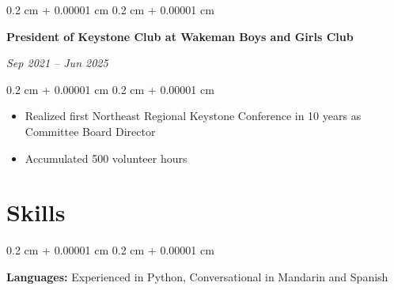 \documentclass[10pt, letterpaper]{article}
\newenvironment{highlights}{
    \begin{itemize}[
        topsep=0.10 cm,
        parsep=0.10 cm,
        partopsep=0pt,
        itemsep=0pt,
        leftmargin=0.4 cm + 10pt
    ]
}{
    \end{itemize}
} %
\newenvironment{onecolentry}{
    \begin{adjustwidth}{
        0.2 cm + 0.00001 cm
    }{
        0.2 cm + 0.00001 cm
    }
}{
    \end{adjustwidth}
} %
\newenvironment{twocolentry}[2][]{
    \onecolentry
    \def\secondColumn{#2}
    \setcolumnwidth{\fill, 4.5 cm}
    \begin{paracol}{2}
}{
    \switchcolumn \raggedleft \secondColumn
    \end{paracol}
    \endonecolentry
} %
\begin{document}
    \begin{twocolentry}{\textit{Sep 2021 – Jun 2025 }}{\textbf{President of Keystone Club at Wakeman Boys and Girls Club}}
    \end{twocolentry}
    
    \vspace{0.10 cm}
    
    \begin{onecolentry}
        \begin{highlights}
            \item Realized first Northeast Regional Keystone Conference in 10 years as Committee Board Director
            \item Accumulated 500 volunteer hours
        \end{highlights}
    \end{onecolentry}
    \vspace{0.2 cm}
    
    
    
    \section{Skills}



        
        \begin{onecolentry}
            \textbf{Languages:} Experienced in Python, Conversational in Mandarin and Spanish
        \end{onecolentry}

        

    

 
        
  
   



    



        


\end{document}
